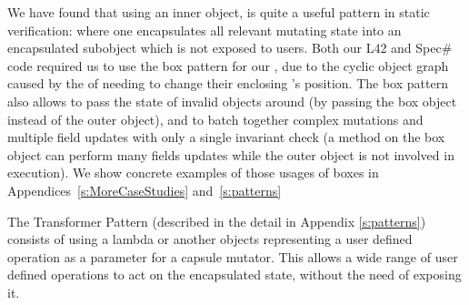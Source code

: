 We have found that using an inner \Q@Box@ object, is quite a useful pattern in static verification: where one encapsulates all relevant mutating state into an encapsulated subobject which is not exposed to users.
Both our L42 and Spec\# code required us to use the box pattern for our \Q@SafeMovable@, due to the cyclic object graph caused by the \Q@Action@s of \Q@Button@s needing to change their enclosing \Q@SafeMovable@'s position.
The box pattern also allows to pass the state of invalid objects around (by passing the box object instead of the outer object), and to batch together complex mutations and multiple field updates with only a single invariant check (a method on the box object can perform many fields updates while the outer object is not involved in execution). We show concrete examples of those usages of boxes in Appendices~\ref{s:MoreCaseStudies} and~\ref{s:patterns}

The Transformer Pattern (described in the detail in Appendix \ref{s:patterns}) consists of 
using a lambda or another objects representing a user defined operation as a parameter for a capsule mutator.
This allows a wide range of user defined operations to act on the encapsulated state, without the need of exposing it.
